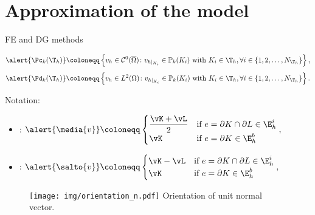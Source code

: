 \section{Approximation of the model}
\begin{frame}{FE and DG methods}
	\footnotesize
	\vspace*{-0.2cm}
	\begin{block}{}
		\begin{equation*}
			\alert{\Pc_k(\T_h)}\coloneqq\left\{v_h\in \mathcal{C}^0(\overline\Omega)\colon v_{h|_{K_i}}\in\mathbb{P}_k(K_i)\text{ with } K_i\in\T_h,\forall i\in\left\{1,2,\ldots,N_{\T_h}\right\}\right\},
		\end{equation*}
		\begin{equation*}
			\alert{\Pd_k(\T_h)}\coloneqq\left\{v_h\in L^2(\Omega)\colon v_{h|_{K_i}}\in\mathbb{P}_k(K_i)\text{ with } K_i\in\T_h,\forall i\in\left\{1,2,\ldots,N_{\T_h}\right\}\right\}.
		\end{equation*}
	\end{block}
	
	\vspace*{0.3cm}
	Notation:
	
	\begin{minipage}{0.69\textwidth}
	\begin{itemize}
		\item {}: 
		$\alert{\media{v}}\coloneqq
		\begin{cases}
			\dfrac{\vK+\vL}{2}&\text{if } e=\partial K\cap\partial L\in\E_h^i\\
			\vK&\text{if }e=\partial K\in\E_h^b
		\end{cases},$
		\item {}: $
		\alert{\salto{v}}\coloneqq
		\begin{cases}
			\vK-\vL&\text{if } e=\partial K\cap\partial L\in\E_h^i\\
			\vK&\text{if }e=\partial K\in\E_h^b
		\end{cases},$
	\end{itemize}
	\end{minipage}
	\begin{minipage}{0.29\textwidth}
		\vspace*{-0.5cm}
		\begin{figure}
			\centering
			\texttt{[image: img/orientation\_n.pdf]}
			{\scriptsize{} Orientation of unit normal vector.}
		\end{figure}
	\end{minipage}
\end{frame}

